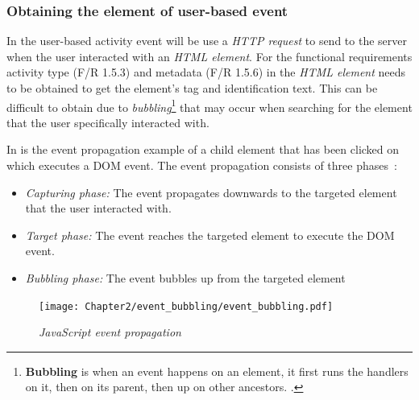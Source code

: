 \subsubsection{Obtaining the element of user-based event}\label{sec:ch2_ElementObtaining}
In  the user-based activity event will be use a \textit{HTTP request} to send to the server when the user interacted with an \textit{HTML element}. For the functional requirements activity type (F/R 1.5.3) and metadata (F/R 1.5.6) in  the \textit{HTML element} needs to be obtained to get the element's tag and identification text. This can be difficult to obtain due to \textit{bubbling}\footnote{\textbf{Bubbling} is when an event happens on an element, it first runs the handlers on it, then on its parent, then up on other ancestors. \cite{EventBubbling}.} that may occur when searching for the element that the user specifically interacted with.\par In  is the event propagation example of a child element that has been clicked on which executes a DOM event. The event propagation consists of three phases~\cite{EventBubbling}:

\begin{itemize}
	\item \textit{Capturing phase:} The event propagates downwards to the targeted element that the user interacted with.
	\item \textit{Target phase:} The event reaches the targeted element to execute the DOM event.
	\item \textit{Bubbling phase:} The event bubbles up from the targeted element
\end{itemize}

\begin{figure}[!htb] %
	\centering %
	\texttt{[image: Chapter2/event\_bubbling/event\_bubbling.pdf]}
	\caption[JavaScript event propagation]
	{\textit{JavaScript event propagation~\cite{EventBubbling}}}\label{fig:ch2_event_bubbling}
\end{figure}

